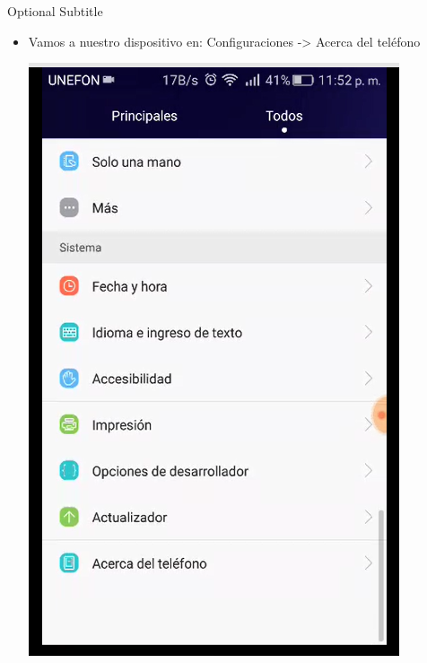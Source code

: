\documentclass{beamer}
\begin{document}
\begin{frame}{34}{Optional Subtitle}
  \begin{itemize}
  \item {
    Vamos a nuestro dispositivo en:
Configuraciones -> Acerca del teléfono
  }
  
 \includegraphics[height=0.7\paperheight]{image/IU34}
  \centering
  \end{itemize}
\end{frame}
\end{document}
